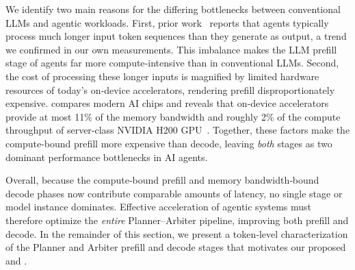 We identify two main reasons for the differing bottlenecks between conventional LLMs and agentic workloads. First, prior work~\cite{gemini_2.5} reports that agents typically process much longer input token sequences than they generate as output, a trend we confirmed in our own measurements. This imbalance makes the LLM prefill stage of agents far more compute‑intensive than in conventional LLMs. Second, the cost of processing these longer inputs is magnified by limited hardware resources of today’s on‑device accelerators, rendering prefill disproportionately expensive.  compares modern AI chips and reveals that on‑device accelerators provide at most 11\% of the memory bandwidth and roughly 2\% of the compute throughput of server‑class NVIDIA H200 GPU~\cite{nvidia_h200_sxm}. Together, these factors make the compute‑bound prefill more expensive than decode, leaving \emph{both} stages as two dominant performance bottlenecks in AI agents.

Overall, because the compute‑bound prefill and memory bandwidth‑bound decode phases now contribute comparable amounts of latency, no single stage or model instance dominates. Effective acceleration of agentic systems must therefore optimize the \textit{entire} Planner–Arbiter pipeline, improving both prefill and decode. In the remainder of this section, we present a token‑level characterization of the Planner and Arbiter prefill and decode stages that motivates our proposed \prefill and \decode.


